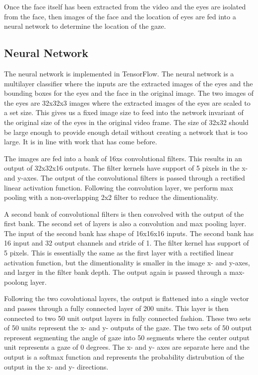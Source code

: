 \documentclass[10pt,twocolumn,letterpaper]{article}
\begin{document}
Once the face itself has been extracted from the video and the eyes
are isolated from the face, then images  of the face and the location
of eyes are fed into a neural network to determine the location of the
gaze.


\subsection{Neural Network}
The neural network is implemented in TensorFlow. The neural network is
a multilayer classifier where the inputs are the extracted images of
the eyes and the bounding boxes for the eyes and the face in the
original image. The two images of the eyes are 32x32x3 images where
the extracted images of the eyes are scaled to a set size. This gives
us a fixed image size to feed into the network invariant of the
original size of the eyes in the original video frame. The size of
32x32 should be large enough to provide enough detail without creating
a network that is too large. It is in line with work that has come
before.

The images are fed into a bank of 16xs convolutional
filters. This results in an output of 32x32x16 outputs. The filter
kernels have support of 5 pixels in the x- and y-axes. The output of
the convolutional filters is passed through a rectified linear
activation function. Following the convolution layer, we perform max pooling with a
non-overlapping 2x2 filter to reduce the dimentionality.

A second bank of convolutional filters is then convolved with the
output of the first bank. The second set of layers is also a
convolution and max pooling layer. The input of the second bank has
shape of 16x16x16 inputs. The second bank has 16 input and 32 output
channels and stride of 1. The filter kernel has support of 5
pixels. This is essentially the same as the first layer with a
rectified linear activation function, but the dimentionality is
smaller in the image x- and y-axes, and larger in the filter bank
depth. The output again is passed through a max-poolong layer.

Following the two covolutional layers, the output is flattened into a
single vector and passes through a fully connected layer of 200
units. This layer is then connected to two 50 unit output layers in
fully connected fashion. These two sets of 50 units represent the x-
and y- outputs of the gaze. The two sets of 50 output represent
segmenting the angle of gaze into 50 segments where the center output
unit represents a gaze of 0 degrees. The x- and y- axes are separate
here and the output is a softmax function and represents the
probability distrubution of the output in the x- and y- directions.
\end{document}
